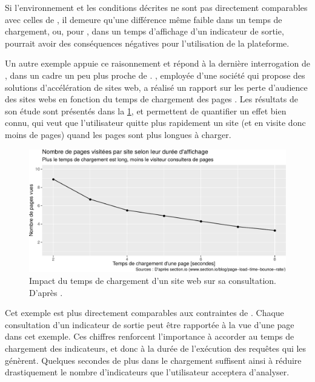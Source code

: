 Si l'environnement et les conditions décrites ne sont pas directement comparables avec celles de \simedb{}, il demeure qu'une différence même faible dans un temps de chargement, ou, pour \simedb{}, dans un temps d'affichage d'un indicateur de sortie, pourrait avoir des conséquences négatives pour l'utilisation de la plateforme.

Un autre exemple appuie ce raisonnement et répond à la dernière interrogation de \citeauthor{patel_speed_2011}, dans un cadre un peu plus proche de \simedb{}.
, employée d'une société qui propose des solutions d'accélération de sites web, a réalisé un rapport sur les perte d'audience des sites webs en fonction du temps de chargement des pages \autocite{elliott_how_2017}.
Les résultats de son étude sont présentés dans la \cref{fig:page-abandon}, et permettent de quantifier un effet bien connu, qui veut que l'utilisateur quitte plus rapidement un site (et en visite donc moins de pages) quand les pages sont plus longues à charger.

\begin{figure}[H]
	\centering
	\includegraphics[width=.9\linewidth]{img/abandon_pages.pdf}
	\caption[Impact du temps de chargement d'un site web sur sa consultation.]{Impact du temps de chargement d'un site web sur sa consultation. D'après \textcite{elliott_how_2017}.}
	\label{fig:page-abandon}
\end{figure}

Cet exemple est plus directement comparables aux contraintes de \simedb{}.
Chaque consultation d'un indicateur de sortie peut être rapportée à la vue d'une page dans cet exemple.
Ces chiffres renforcent l'importance à accorder au temps de chargement des indicateurs, et donc à la durée de l'exécution des requêtes qui les génèrent.
Quelques secondes de plus dans le chargement suffisent ainsi à réduire drastiquement le nombre d'indicateurs que l'utilisateur acceptera d'analyser.

